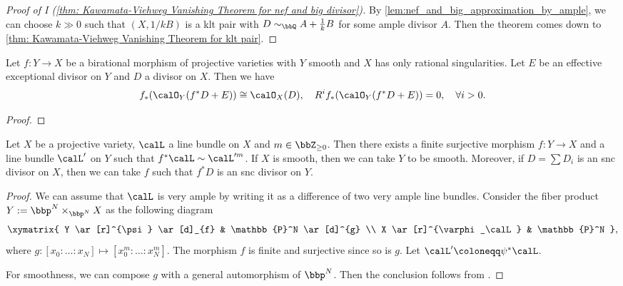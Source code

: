     \begin{proof}[Proof of I (\cref{thm: Kawamata-Viehweg Vanishing Theorem for nef and big divisor})]
        By \cref{lem:nef_and_big_approximation_by_ample}, we can choose \(k \gg 0\) such that \((X,1/k B)\) is a klt pair with \(D \sim_\bbQ A + \frac{1}{k}B\) for some ample divisor \(A\).
        Then the theorem comes down to \cref{thm: Kawamata-Viehweg Vanishing Theorem for klt pair}.
    \end{proof}

    \begin{lemma}\label{lem:higher_direct_image_of_exceptional_divisor}
        Let \(f:Y \to X\) be a birational morphism of projective varieties with \(Y\) smooth and \(X\) has only rational singularities.
        Let \(E\) be an effective exceptional divisor on \(Y\) and \(D\) a divisor on \(X\).
        Then we have
        \[ f_*(\calO_Y(f^*D + E)) \cong \calO_X(D), \quad R^if_*(\calO_Y(f^*D + E)) = 0,\quad \forall i > 0. \]
    \end{lemma}
    \begin{proof}
    \end{proof}

    \begin{lemma}\label{lem: divide a divisor by a finite surjective morphism}
        Let \(X\) be a projective variety, \(\calL\) a line bundle on \(X\) and \(m \in \bbZ_{\geq 0}\).
        Then there exists a finite surjective morphism \(f: Y \to X\) and a line bundle \(\calL'\) on \(Y\) such that \(f^*\calL \sim \calL'^{m}\).
        If \(X\) is smooth, then we can take \(Y\) to be smooth.
        Moreover, if \(D = \sum D_i\) is an snc divisor on \(X\), then we can take \(f\) such that \(f^*D\) is an snc divisor on \(Y\).
    \end{lemma}
    \begin{proof}
        We can assume that \(\calL\) is very ample by writing it as a difference of two very ample line bundles.
        Consider the fiber product \(Y:= \bbp^N \times_{\bbp^N} X\) as the following diagram
        \[ \xymatrix{
            Y \ar[r]^{\psi} \ar[d]_{f} & \mathbb{P}^N \ar[d]^{g} \\
            X \ar[r]^{\varphi_\calL} & \mathbb{P}^N
        }, \]
        where \(g: [x_0: \ldots: x_N] \mapsto [x_0^m: \ldots: x_N^m]\).
        The morphism \(f\) is finite and surjective since so is \(g\).
        Let \(\calL'\coloneqq \psi^*\calL\).

        For smoothness, we can compose \(g\) with a general automorphism of \(\bbp^N\).
        Then the conclusion follows from \cite[Chapter III, Theorem 10.8]{Har77}.
    \end{proof}

